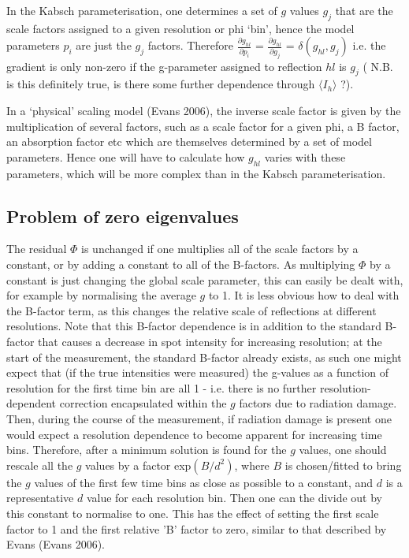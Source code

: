 \documentclass[11pt, oneside]{article}   	%
\begin{document}
In the Kabsch parameterisation, one determines a set of $g$ values $g_j$ that are the scale factors assigned to a given resolution or phi `bin', hence the model parameters $p_i$ are just the $g_{j}$ factors. Therefore $\frac{\partial g_{hl}}{\partial p_i}$ = $\frac{\partial g_{hl}}{\partial g_j}$  = $\delta(g_{hl},g_{j})$ i.e. the gradient is only non-zero if the g-parameter assigned to reflection $hl$ is $g_j$ ({\color{red} N.B. is this definitely true, is there some further dependence through $\langle I_h \rangle$ ?}).

In a `physical' scaling model (Evans 2006), the inverse scale factor is given by the multiplication of several factors, such as a scale factor for a given phi, a B factor, an absorption factor etc which are themselves determined by a set of model parameters. Hence one will have to calculate how $g_{hl}$ varies with these parameters, which will be more complex than in the Kabsch parameterisation.


\subsection{Problem of zero eigenvalues}
The residual $\Phi$ is unchanged if one multiplies all of the scale factors by a constant, or by adding a constant to all of the B-factors. As multiplying $\Phi$ by a constant is just changing the global scale parameter, this can easily be dealt with, for example by normalising the average $g$ to 1. It is less obvious how to deal with the B-factor term, as this changes the relative scale of reflections at different resolutions. 
Note that this B-factor dependence is in addition to the standard B-factor that causes a decrease in spot intensity for increasing resolution; at the start of the measurement, the standard B-factor already exists, as such one might expect that (if the true intensities were measured) the g-values as a function of resolution for the first time bin are all 1 - i.e. there is no further resolution-dependent correction encapsulated within the $g$ factors due to radiation damage. Then, during the course of the measurement, if radiation damage is present one would expect a resolution dependence to become apparent for increasing time bins. 
Therefore, after a minimum solution is found for the $g$ values, one should rescale all the $g$ values by a factor exp$(B/d^2)$, where $B$ is chosen/fitted to bring the $g$ values of the first few time bins as close as possible to a constant, and $d$ is a representative $d$ value for each resolution bin. Then one can the divide out by this constant to normalise to one. This has the effect of setting the first scale factor to 1 and the first relative 'B' factor to zero, similar to that described by Evans (Evans 2006). 
\end{document}
